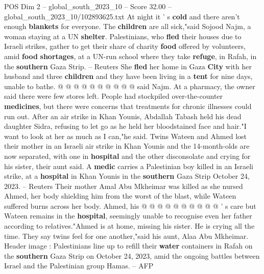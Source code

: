 \begin{textsample}{POS Dim 2 – global\_south\_2023\_10 – Score 32.00 – global\_south\_2023\_10/102893625.txt}
At night it ' s \textbf{cold} and there aren't enough \textbf{blankets} for everyone.
The \textbf{children} are all sick,"said Sojood Najm, a woman staying at a UN \textbf{shelter}.
Palestinians, who \textbf{fled} their houses due to Israeli strikes, gather to get their share of charity \textbf{food} offered by volunteers, amid \textbf{food} \textbf{shortages}, at a UN-run school where they take \textbf{refuge}, in Rafah, in the \textbf{southern} Gaza Strip. -- Reuters She \textbf{fled} her home in Gaza \textbf{City} with her husband and three \textbf{children} and they have been living in a \textbf{tent} for nine days, unable to bathe. @ @ @ @ @ @ @ @ @ @ said Najm.
At a pharmacy, the owner said there were few stores left.
People had stockpiled over-the-counter \textbf{medicines}, but there were concerns that treatments for chronic illnesses could run out.
After an air strike in Khan Younis, Abdallah Tabash held his dead daughter Sidra, refusing to let go as he held her bloodstained face and hair."I want to look at her as much as I can,"he said.
Twins Wateen and Ahmed lost their mother in an Israeli air strike in Khan Younis and the 14-month-olds are now separated, with one in \textbf{hospital} and the other disconsolate and crying for his sister, their aunt said.
A \textbf{medic} carries a Palestinian boy killed in an Israeli strike, at a \textbf{hospital} in Khan Younis in the \textbf{southern} Gaza Strip October 24, 2023. -- Reuters Their mother Amal Abu Mkheimar was killed as she nursed Ahmed, her body shielding him from the worst of the blast, while Wateen suffered burns across her body.
Ahmed, his @ @ @ @ @ @ @ @ @ @ ' s care but Wateen remains in the \textbf{hospital}, seemingly unable to recognise even her father according to relatives."Ahmed is at home, missing his sister.
He is crying all the time.
They say twins feel for one another,"said his aunt, Alaa Abu Mkheimar.
Header image : Palestinians line up to refill their \textbf{water} containers in Rafah on the \textbf{southern} Gaza Strip on October 24, 2023, amid the ongoing battles between Israel and the Palestinian group Hamas. -- AFP

\end{textsample}
